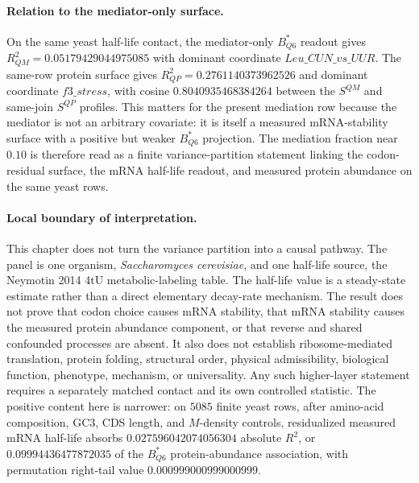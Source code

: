\paragraph{Relation to the mediator-only surface.}
On the same yeast half-life contact, the mediator-only $B^{*}_{Q6}$ readout gives $R^{2}_{QM}=0.05179429044975085$ with dominant coordinate $Leu\_CUN\_vs\_UUR$. The same-row protein surface gives $R^{2}_{QP}=0.2761140373962526$ and dominant coordinate $f3\_stress$, with cosine $0.8040935468384264$ between the $S^{QM}$ and same-join $S^{QP}$ profiles. This matters for the present mediation row because the mediator is not an arbitrary covariate: it is itself a measured mRNA-stability surface with a positive but weaker $B^{*}_{Q6}$ projection. The mediation fraction near $0.10$ is therefore read as a finite variance-partition statement linking the codon-residual surface, the mRNA half-life readout, and measured protein abundance on the same yeast rows.

\paragraph{Local boundary of interpretation.}
This chapter does not turn the variance partition into a causal pathway. The panel is one organism, \textit{Saccharomyces cerevisiae}, and one half-life source, the Neymotin 2014 4tU metabolic-labeling table. The half-life value is a steady-state estimate rather than a direct elementary decay-rate mechanism. The result does not prove that codon choice causes mRNA stability, that mRNA stability causes the measured protein abundance component, or that reverse and shared confounded processes are absent. It also does not establish ribosome-mediated translation, protein folding, structural order, physical admissibility, biological function, phenotype, mechanism, or universality. Any such higher-layer statement requires a separately matched contact and its own controlled statistic. The positive content here is narrower: on $5085$ finite yeast rows, after amino-acid composition, GC3, CDS length, and $M$-density controls, residualized measured mRNA half-life absorbs $0.027596042074056304$ absolute $R^{2}$, or $0.09994436477872035$ of the $B^{*}_{Q6}$ protein-abundance association, with permutation right-tail value $0.000999000999000999$.